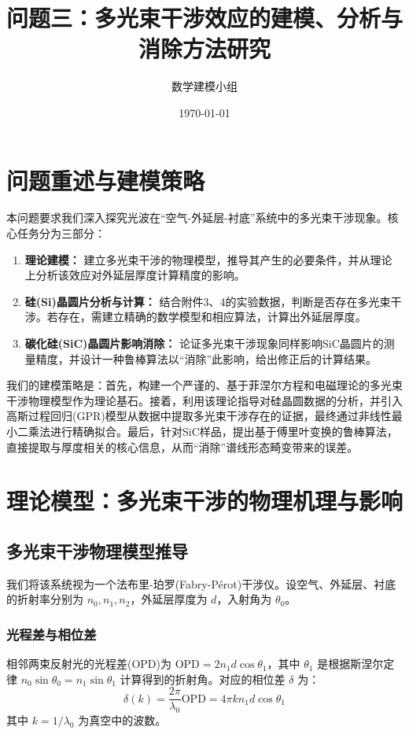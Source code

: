 \documentclass[UTF8, 12pt]{ctexart}
\title{\bf \LARGE 问题三：多光束干涉效应的建模、分析与消除方法研究}
\author{数学建模小组}
\date{\today}
\begin{document}
\maketitle
{}
\tableofcontents
\newpage

\section{问题重述与建模策略}
本问题要求我们深入探究光波在“空气-外延层-衬底”系统中的多光束干涉现象。核心任务分为三部分：
\begin{enumerate}
    \item \textbf{理论建模：} 建立多光束干涉的物理模型，推导其产生的必要条件，并从理论上分析该效应对外延层厚度计算精度的影响。
    \item \textbf{硅(Si)晶圆片分析与计算：} 结合附件3、4的实验数据，判断是否存在多光束干涉。若存在，需建立精确的数学模型和相应算法，计算出外延层厚度。
    \item \textbf{碳化硅(SiC)晶圆片影响消除：} 论证多光束干涉现象同样影响SiC晶圆片的测量精度，并设计一种鲁棒算法以“消除”此影响，给出修正后的计算结果。
\end{enumerate}
我们的建模策略是：首先，构建一个严谨的、基于菲涅尔方程和电磁理论的多光束干涉物理模型作为理论基石。接着，利用该理论指导对硅晶圆数据的分析，并引入高斯过程回归(GPR)模型从数据中提取多光束干涉存在的证据，最终通过非线性最小二乘法进行精确拟合。最后，针对SiC样品，提出基于傅里叶变换的鲁棒算法，直接提取与厚度相关的核心信息，从而“消除”谱线形态畸变带来的误差。

\section{理论模型：多光束干涉的物理机理与影响}
\subsection{多光束干涉物理模型推导}
我们将该系统视为一个法布里-珀罗(Fabry-Pérot)干涉仪。设空气、外延层、衬底的折射率分别为 $n_0, n_1, n_2$，外延层厚度为 $d$，入射角为 $\theta_0$。

\subsubsection{光程差与相位差}
相邻两束反射光的光程差(OPD)为 $\text{OPD} = 2n_1 d \cos\theta_1$，其中 $\theta_1$ 是根据斯涅尔定律 $n_0 \sin\theta_0 = n_1 \sin\theta_1$ 计算得到的折射角。对应的相位差 $\delta$ 为：
\begin{equation}
    \delta(k) = \frac{2\pi}{\lambda_0} \text{OPD} = 4\pi k n_1 d \cos\theta_1
    \label{eq:phase_diff}
\end{equation}
其中 $k=1/\lambda_0$ 为真空中的波数。
\end{document}
